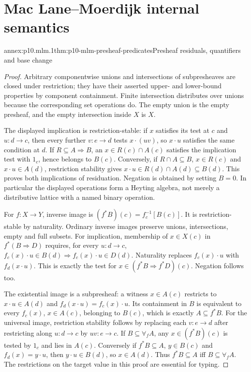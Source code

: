\section{Mac Lane--Moerdijk internal semantics}

\begin{annexitem}{annex:p10.mlm.1}{thm:p10-mlm-presheaf-predicates}{Presheaf residuals, quantifiers and base change}
\begin{proof}
Arbitrary componentwise unions and intersections of subpresheaves are closed
under restriction; they have their asserted upper- and lower-bound properties
by component containment. Finite intersection distributes over unions because
the corresponding set operations do. The empty union is the empty presheaf,
and the empty intersection inside \(X\) is \(X\).

The displayed implication is restriction-stable: if \(x\) satisfies its test
at \(c\) and \(u:d\to c\), then every further \(v:e\to d\) tests \(x\cdot(uv)\),
so \(x\cdot u\) satisfies the same condition at \(d\).
If \(R\subseteq A\Rightarrow B\), an \(x\in R(c)\cap A(c)\) satisfies the
implication test with \(1_c\), hence belongs to \(B(c)\).
Conversely, if \(R\cap A\subseteq B\), \(x\in R(c)\) and \(x\cdot u\in A(d)\),
restriction stability gives \(x\cdot u\in R(d)\cap A(d)\subseteq B(d)\).
This proves both implications of residuation. Negation is obtained by setting
\(B=0\). In particular the displayed operations form a Heyting algebra,
not merely a distributive lattice with a named binary operation.

For \(f:X\to Y\), inverse image is \((f^*B)(c)=f_c^{-1}[B(c)]\).
It is restriction-stable by naturality. Ordinary inverse images preserve
unions, intersections, empty and full subsets. For implication, membership
of \(x\in X(c)\) in \(f^*(B\Rightarrow D)\) requires, for every \(u:d\to c\),
\(f_c(x)\cdot u\in B(d)\Rightarrow f_c(x)\cdot u\in D(d)\).
Naturality replaces \(f_c(x)\cdot u\) with \(f_d(x\cdot u)\). This is exactly
the test for \(x\in(f^*B\Rightarrow f^*D)(c)\). Negation follows too.

The existential image is a subpresheaf: a witness \(x\in A(c)\) restricts
to \(x\cdot u\in A(d)\) and \(f_d(x\cdot u)=f_c(x)\cdot u\).
Its containment in \(B\) is equivalent to every \(f_c(x)\), \(x\in A(c)\),
belonging to \(B(c)\), which is exactly \(A\subseteq f^*B\).
For the universal image, restriction stability follows by replacing each
\(v:e\to d\) after restricting along \(u:d\to c\) by \(uv:e\to c\).
If \(B\subseteq\forall_f A\), any \(x\in(f^*B)(c)\) is tested by \(1_c\)
and lies in \(A(c)\). Conversely if \(f^*B\subseteq A\), \(y\in B(c)\) and
\(f_d(x)=y\cdot u\), then \(y\cdot u\in B(d)\), so \(x\in A(d)\).
Thus \(f^*B\subseteq A\) iff \(B\subseteq\forall_f A\).
The restrictions on the target value in this proof are essential for typing.


\end{proof}
\end{annexitem}
